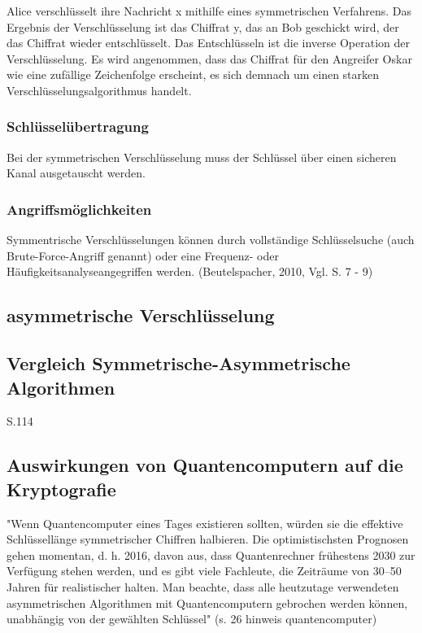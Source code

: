 Alice verschlüsselt ihre Nachricht x mithilfe eines symmetrischen Verfahrens. Das Ergebnis der Verschlüsselung ist das Chiffrat y, das an Bob
geschickt wird, der das Chiffrat wieder entschlüsselt. Das Entschlüsseln ist die inverse Operation der Verschlüsselung. Es wird angenommen, dass das Chiffrat für den Angreifer Oskar wie eine zufällige Zeichenfolge erscheint, es sich demnach um einen starken Verschlüsselungsalgorithmus handelt.\newline

\newline
\subsubsection{Schlüsselübertragung}

Bei der symmetrischen Verschlüsselung muss der Schlüssel über einen sicheren Kanal ausgetauscht werden.\newline
\newline


\subsubsection{Angriffsmöglichkeiten}

Symmentrische Verschlüsselungen können durch vollständige Schlüsselsuche (auch Brute-Force-Angriff genannt) oder eine Frequenz- oder Häufigkeitsanalyseangegriffen werden. (Beutelspacher, 2010, Vgl. S. 7 - 9)\newline
\newline


\subsection{asymmetrische Verschlüsselung}






\subsection{Vergleich Symmetrische-Asymmetrische Algorithmen}
S.114


\subsection{Auswirkungen von Quantencomputern auf die Kryptografie}
"Wenn Quantencomputer eines Tages existieren sollten, würden sie die effektive Schlüssellänge
symmetrischer Chiffren halbieren. Die optimistischsten Prognosen gehen momentan, d. h. 2016,
davon aus, dass Quantenrechner frühestens 2030 zur Verfügung stehen werden, und es gibt viele
Fachleute, die Zeiträume von 30–50 Jahren für realistischer halten. Man beachte, dass alle heutzutage verwendeten asymmetrischen Algorithmen mit Quantencomputern gebrochen werden können, unabhängig von der gewählten Schlüssel" (s. 26 hinweis quantencomputer)

